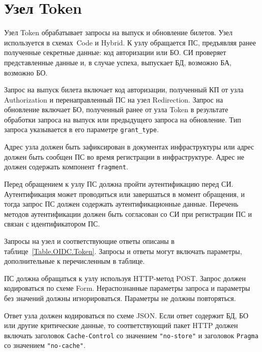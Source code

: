 \section{Узел Token}\label{OIDC.Token}

Узел Token обрабатывает запросы на выпуск и обновление билетов.
%
Узел используется в схемах~Code и Hybrid. 
% 
К узлу обращается ПС, предъявляя ранее полученные секретные данные:
код авторизации или БО.
%
СИ проверяет представленные данные и, в случае успеха, выпускает БД, 
возможно БА, возможно БО.

Запрос на выпуск билета включает код авторизации, полученный КП от узла 
Authorization и перенаправленный ПС на узел Redirection. 
%
Запрос на обновление включает БО, полученный ранее от узла Token в результате 
обработки запроса на выпуск или предыдущего запроса на обновление.
%
Тип запроса указывается в его параметре \lstinline{grant_type}.

Адрес узла должен быть зафиксирован в документах инфраструктуры
или адрес должен быть сообщен ПС во время регистрации в инфраструктуре.
%
Адрес не должен содержать компонент \lstinline{fragment}.

Перед обращением к узлу ПС должна пройти аутентификацию перед СИ. 
Аутентификация может проводиться или завершаться в момент обращения,
и тогда запрос ПС должен содержать аутентификационные данные. 
%
Перечень методов аутентификации должен быть согласован со СИ при 
регистрации ПС и связан с идентификатором ПС.

Запросы на узел и соответствующие ответы описаны в 
таблице~\ref{Table.OIDC.Token}. 
%
Запросы и ответы могут включать параметры, дополнительные к перечисленным в 
таблице.

ПС должна обращаться к узлу используя HTTP-метод POST.
%
Запрос должен кодироваться по схеме Form.
%
Нераспознанные параметры запроса и параметры без значений должны 
игнорироваться.
%
Параметры не должны повторяться.

Ответ узла должен кодироваться по схеме JSON. 
%
Если ответ содержит БД, БО или другие критические данные, то соответствующий 
пакет HTTP должен включать заголовок \lstinline{Cache-Control} со значением
\lstinline{"no-store"} и заголовок \lstinline{Pragma} со значением 
\lstinline{"no-cache"}.

